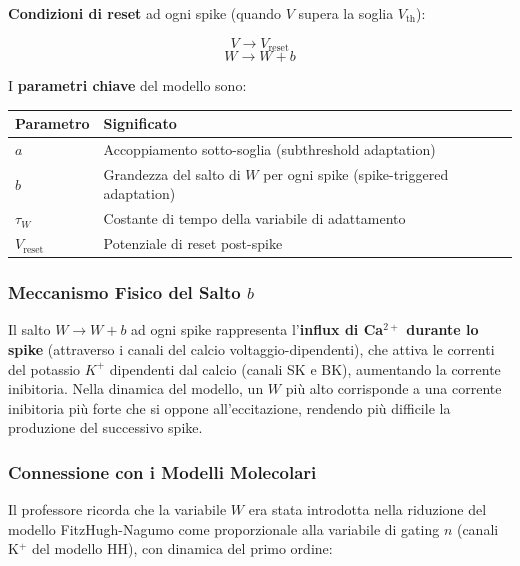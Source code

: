 \textbf{Condizioni di reset} ad ogni spike (quando $V$ supera la soglia $V_{\text{th}}$):

\begin{equation}
V \to V_{\text{reset}}
\end{equation}
\begin{equation}
W \to W + b
\end{equation}

I \textbf{parametri chiave} del modello sono:

\begin{table}[htbp]
    \centering
    \renewcommand{\arraystretch}{1.3}
    \begin{tabularx}{\textwidth}{|l|X|}
    \hline
    \textbf{Parametro} & \textbf{Significato} \\
    \hline
    $a$ & Accoppiamento sotto-soglia (subthreshold adaptation) \\
    \hline
    $b$ & Grandezza del salto di $W$ per ogni spike (spike-triggered adaptation) \\
    \hline
    $\tau_W$ & Costante di tempo della variabile di adattamento \\
    \hline
    $V_{\text{reset}}$ & Potenziale di reset post-spike \\
    \hline
    \end{tabularx}
\end{table}

\subsubsection{Meccanismo Fisico del Salto $b$}

Il salto $W \to W + b$ ad ogni spike rappresenta l'\textbf{influx di Ca$^{2+}$ durante lo spike} (attraverso i canali del calcio voltaggio-dipendenti), che attiva le correnti del potassio $K^+$ dipendenti dal calcio (canali SK e BK), aumentando la corrente inibitoria. Nella dinamica del modello, un $W$ più alto corrisponde a una corrente inibitoria più forte che si oppone all'eccitazione, rendendo più difficile la produzione del successivo spike.

\subsubsection{Connessione con i Modelli Molecolari}

Il professore ricorda che la variabile $W$ era stata introdotta nella riduzione del modello FitzHugh-Nagumo come proporzionale alla variabile di gating $n$ (canali K$^+$ del modello HH), con dinamica del primo ordine:

